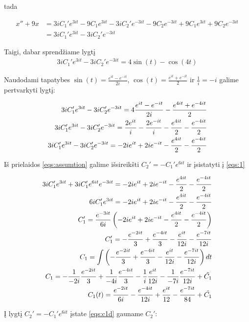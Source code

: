\documentclass[11pt]{article}
\begin{document}
tada

\begin{align*}
x''+9x&=3iC_1'e^{3it}-9C_1e^{3it}-3iC_2'e^{-3it}-9C_2e^{-3it}+9C_1e^{3it}+9C_2e^{-3it}\\
&=3iC_1'e^{3it}-3iC_2'e^{-3it}
\end{align*}

Taigi, dabar sprendžiame lygtį
\begin{align*}
3iC_1'e^{3it}-3iC_2'e^{-3it}=4\sin(t)-\cos(4t)
\end{align*}

Naudodami tapatybes $\sin(t)=\frac{e^{it}-e^{-it}}{2i}$, $\cos(t)=\frac{e^{it}+e^{-it}}{2}$ ir $\frac{1}{i}=-i$ galime pertvarkyti lygtį:

\begin{align}
3iC_1'e^{3it}-3iC_2'e^{-3it}=4\frac{e^{it}-e^{-it}}{2i}-\frac{e^{4it}+e^{-4it}}{2}\notag\\
3iC_1'e^{3it}-3iC_2'e^{-3it}=\frac{2e^{it}}{i}-\frac{2e^{-it}}{i}-\frac{e^{4it}}{2}-\frac{e^{-4it}}{2}\notag\\
3iC_1'e^{3it}-3iC_2'e^{-3it}=-2ie^{it}+2ie^{-it}-\frac{e^{4it}}{2}-\frac{e^{-4it}}{2}\label{eqs:1}
\end{align}

Iš prielaidos \eqref{eqs:assumtion} galime išsireikšti $C_2'=-C_1'e^{6it}$ ir įsistatyti į \eqref{eqs:1}

\begin{align}
3iC_1'e^{3it}+3iC_1'e^{6it}e^{-3it}=-2ie^{it}+2ie^{-it}-\frac{e^{4it}}{2}-\frac{e^{-4it}}{2} \notag\\
6iC_1'e^{3it}=-2ie^{it}+2ie^{-it}-\frac{e^{4it}}{2}-\frac{e^{-4it}}{2} \notag\\
C_1'=\frac{e^{-3it}}{6i}\left(-2ie^{it}+2ie^{-it}-\frac{e^{4it}}{2}-\frac{e^{-4it}}{2}\right) \notag\\
C_1'=-\frac{e^{-2it}}{3}+\frac{e^{-4it}}{3}-\frac{e^{it}}{12i}-\frac{e^{-7it}}{12i} \label{eqs:c1d}\\
C_1=\int\left(-\frac{e^{-2it}}{3}+\frac{e^{-4it}}{3}-\frac{e^{it}}{12i}-\frac{e^{-7it}}{12i}\right)dt \notag\\
C_1=-\frac{1}{-2i}\frac{e^{-2it}}{3}+\frac{1}{-4i}\frac{e^{-4it}}{3}-\frac{1}{i}\frac{e^{it}}{12i}-\frac{1}{-7i}\frac{e^{-7it}}{12i}+\tilde{C_1}\notag\\
C_1(t)=\frac{e^{-2it}}{6i}-\frac{e^{-4it}}{12i}+\frac{e^{it}}{12}-\frac{e^{-7it}}{84}+\tilde{C_1} \label{eqs:c1}
\end{align}

Į lygtį $C_2'=-C_1'e^{6it}$ įstate \eqref{eqs:c1d} gauname $C_2'$:
\end{document}
